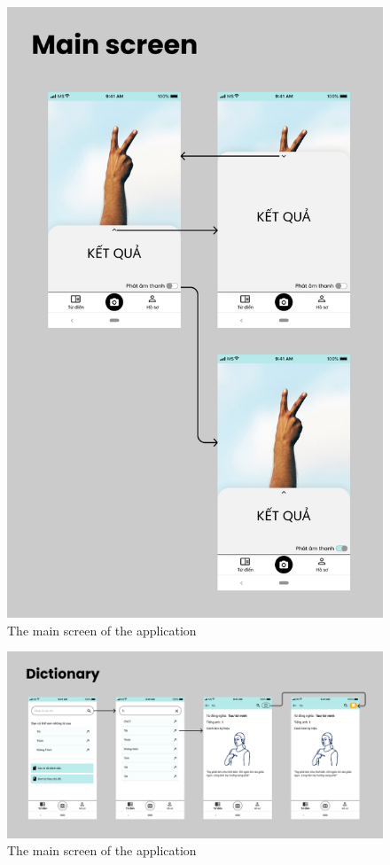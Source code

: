 \begin{figure}[H]
  \centering
  \includegraphics[height=0.8\textheight]{img/Chap5/Main_screen.png}
  \caption{The main screen of the application}
\end{figure}

\begin{figure}[H]
  \centering
  \includegraphics[width=\textwidth]{img/Chap5/Dictionary.png}
  \caption{The main screen of the application}
\end{figure}

